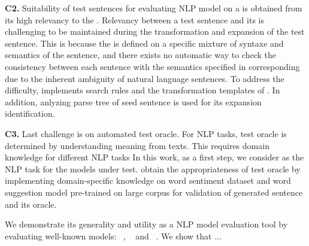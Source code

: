 
\noindent \textbf{C2.} Suitability of test sentences for evaluating
NLP model on a \lc is obtained from its high relevancy to the
\lc. Relevancy between a test sentence and its \lc is challenging to
be maintained during the transformation and expansion of the test
sentence.  This is because the \lc is defined on a specific mixture of
syntaxe and semantics of the sentence, and there exists no automatic
way to check the consistency between each sentence with the semantics
specified in corresponding \lc due to the inherent ambiguity of
natural language sentences. To address the difficulty, \tool
implements search rules and the transformation templates of \lcs. In
addition, anlyzing parse tree of seed sentence is used for its
expansion identification.

\noindent \textbf{C3.} Last challenge is on automated test oracle.
For NLP tasks, test oracle is determined by understanding meaning from
texts. This requires domain knowledge for different NLP tasks
In this work, as a first step, we consider \sa as the NLP task for the
models under test. \tool obtain the appropriateness of test oracle by
implementing domain-specific knowledge on word sentiment dataset and
word suggestion model pre-trained on large corpus for validation of
generated sentence and its oracle.


We demonstrate its generality and utility as a NLP model evaluation
tool by evaluating well-known \sa models: \Bert~\cite{devlin2019bert},
\Roberta~\cite{liu2019roberta} and \Dbert~\cite{sanh2019distilbert}.
We show that ...



